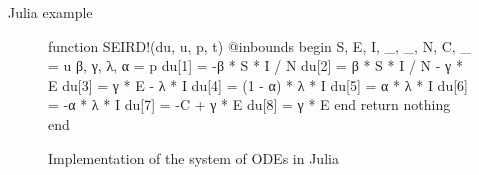 \begin{frame}[fragile]{Julia example}
\begin{figure}[!htb]
\centering
\begin{jllisting}
function SEIRD!(du, u, p, t)
    @inbounds begin
        S, E, I, _, _, N, C, _ = u
        β, γ, λ, α = p
        du[1] = -β * S * I / N
        du[2] = β * S * I / N - γ * E
        du[3] = γ * E - λ * I
        du[4] = (1 - α) * λ * I
        du[5] = α * λ * I
        du[6] = -α * λ * I
        du[7] = -C + γ * E
        du[8] = γ * E
    end
    return nothing
end
\end{jllisting}
\caption{Implementation of the system of ODEs in Julia}
\label{fig:diffeq-seird-inplace}
\end{figure}
\end{frame}
